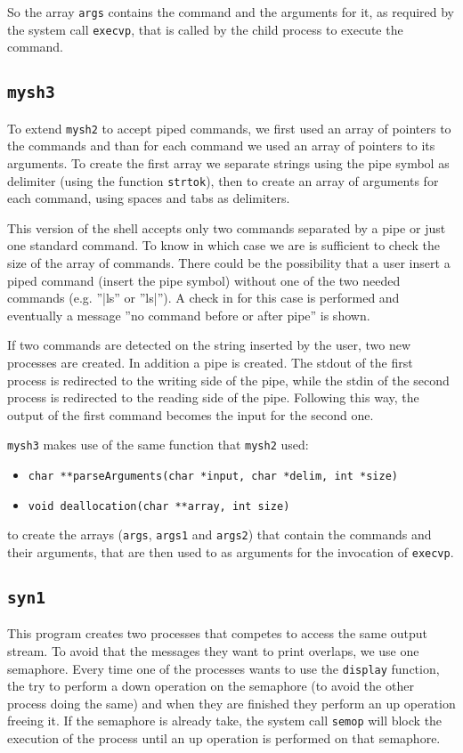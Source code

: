 So the array \texttt{args} contains the command and the arguments for it, as required by the system call \texttt{execvp}, that is called by the child process to execute the command.

\subsection{\texttt{mysh3}}
To extend \texttt{mysh2} to accept piped commands, we first used an array of pointers to the commands and than for each command we used an array of pointers to its arguments. To create the first array we separate strings using the pipe symbol as delimiter (using the function \texttt{strtok}), then to create an array of arguments for each command, using spaces and tabs as delimiters.  \newline

This version of the shell accepts only two commands separated by a pipe or just one standard command. To know in which case we are is sufficient to check the size of the array of commands. There could be the possibility that a user insert a piped command (insert the pipe symbol) without one of the two needed commands (e.g. ''|ls'' or ''ls|''). A check in for this case is performed and eventually a message ''no command before or after pipe'' is shown.\newline

If two commands are detected on the string inserted by the user, two new processes are created. In addition a pipe is created. The stdout of the first process is redirected to the writing side of the pipe, while the stdin of the second process is redirected to the reading side of the pipe. Following this way, the output of the first command becomes the input for the second one. \newline

\texttt{mysh3} makes use of the same function that \texttt{mysh2} used:
\begin{itemize}
\item{\texttt{char **parseArguments(char *input, char *delim, int *size)}}
\item{\texttt{void deallocation(char **array, int size)}}
\end{itemize}
to create the arrays (\texttt{args}, \texttt{args1} and \texttt{args2}) that contain the commands and their arguments, that are then used to as arguments for the invocation of \texttt{execvp}.



\subsection{\texttt{syn1}}
This program creates two processes that competes to access the same output stream. To avoid that the messages they want to print overlaps, we use one semaphore. Every time one of the processes wants to use the \texttt{display} function, the try to perform a down operation on the semaphore (to avoid the other process doing the same) and when they are finished they perform an up operation freeing it. If the semaphore is already take, the system call \texttt{semop} will block the execution of the process until an up operation is performed on that semaphore.

